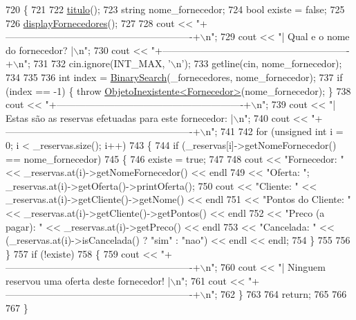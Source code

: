 \begin{DoxyCode}
720                                                    \{
721 
722     \hyperlink{classEmpresa_ad79f7196a8ce7256771cbd7b9542155c}{titulo}();
723     \textcolor{keywordtype}{string} nome\_fornecedor;
724     \textcolor{keywordtype}{bool} existe = \textcolor{keyword}{false};
725 
726     \hyperlink{classEmpresa_a55c3756c01b45b41ad03f4e4f3e4dcac}{displayFornecedores}();
727 
728     cout << \textcolor{stringliteral}{"+----------------------------------------------------------+\(\backslash\)n"};
729     cout << \textcolor{stringliteral}{"| Qual e o nome do fornecedor?                                |\(\backslash\)n"};
730     cout << \textcolor{stringliteral}{"+----------------------------------------------------------+\(\backslash\)n"};
731 
732     cin.ignore(INT\_MAX, \textcolor{charliteral}{'\(\backslash\)n'});
733     getline(cin, nome\_fornecedor);
734 
735 
736     \textcolor{keywordtype}{int} index = \hyperlink{extras_8h_abc85c93edf561168b5bbee8054caa388}{BinarySearch}(\_fornecedores, nome\_fornecedor);
737     \textcolor{keywordflow}{if} (index == -1) \{ \textcolor{keywordflow}{throw} \hyperlink{classObjetoInexistente}{ObjetoInexistente<Fornecedor>}(nome\_fornecedor); \}
738     cout << \textcolor{stringliteral}{"+----------------------------------------------------------+\(\backslash\)n"};
739     cout << \textcolor{stringliteral}{"| Estas são as reservas efetuadas para este fornecedor:    |\(\backslash\)n"};
740     cout << \textcolor{stringliteral}{"+----------------------------------------------------------+\(\backslash\)n"};
741 
742     \textcolor{keywordflow}{for} (\textcolor{keywordtype}{unsigned} \textcolor{keywordtype}{int} i = 0; i < \_reservas.size(); i++)
743     \{
744         \textcolor{keywordflow}{if} (\_reservas[i]->getNomeFornecedor() == nome\_fornecedor)
745         \{
746             existe = \textcolor{keyword}{true};
747 
748             cout << \textcolor{stringliteral}{"Fornecedor: "} << \_reservas.at(i)->getNomeFornecedor() << endl
749                 << \textcolor{stringliteral}{"Oferta: "};  \_reservas.at(i)->getOferta()->printOferta();
750             cout << \textcolor{stringliteral}{"Cliente: "} << \_reservas.at(i)->getCliente()->getNome() << endl
751                 << \textcolor{stringliteral}{"Pontos do Cliente: "} << \_reservas.at(i)->getCliente()->getPontos() << endl
752                 << \textcolor{stringliteral}{"Preco (a pagar): "} << \_reservas.at(i)->getPreco() << endl
753                 << \textcolor{stringliteral}{"Cancelada: "} << (\_reservas.at(i)->isCancelada() ? \textcolor{stringliteral}{"sim"} : \textcolor{stringliteral}{"nao"}) << endl << endl;
754         \}
755         
756     \}
757     \textcolor{keywordflow}{if} (!existe)
758     \{
759         cout << \textcolor{stringliteral}{"+----------------------------------------------------------+\(\backslash\)n"};
760         cout << \textcolor{stringliteral}{"| Ninguem reservou uma oferta deste fornecedor!            |\(\backslash\)n"};
761         cout << \textcolor{stringliteral}{"+----------------------------------------------------------+\(\backslash\)n"};
762     \}
763 
764     \textcolor{keywordflow}{return};
765 
766 
767 \}
\end{DoxyCode}


